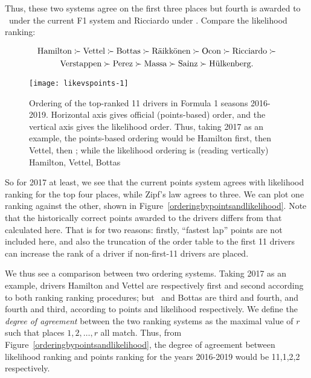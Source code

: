 \documentclass[a4,12pt]{article}
\begin{document}
\noindent Thus, these two systems agree on the first three places but
fourth is awarded to \raik\ under the current F1 system and Ricciardo
under \citeauthor{zipf1949}.  Compare the likelihood ranking:

\begin{multline}\nonumber
\mbox{Hamilton}\succ
\mbox{Vettel}\succ
\mbox{Bottas}\succ
\mbox{R\"{a}ikk\"{o}nen}\succ
\mbox{Ocon}\succ
\mbox{Ricciardo}\succ\\
\mbox{Verstappen}\succ
\mbox{Perez}\succ
\mbox{Massa}\succ
\mbox{Sainz}\succ
\mbox{H\"{u}lkenberg}.
\end{multline}

\begin{figure}
{\centering \texttt{[image: likevspoints-1]}}
\caption{\doublespacing Ordering of
  the \label{orderingbypointsandlikelihood} top-ranked 11 drivers in
  Formula 1 seasons 2016-2019.  Horizontal axis gives official
  (points-based) order, and the vertical axis gives the likelihood
  order.  Thus, taking 2017 as an example, the points-based ordering
  would be Hamilton first, then Vettel, then \raik; while the
  likelihood ordering is (reading vertically) Hamilton, Vettel, Bottas
}\label{fig:likevspoints}
\end{figure}

\noindent So for 2017 at least, we see that the current points system
agrees with likelihood ranking for the top four places, while Zipf's
law agrees to three.  We can plot one ranking against the other, shown
in Figure~\ref{orderingbypointsandlikelihood}.  Note that the
historically correct points awarded to the drivers differs from that
calculated here.  That is for two reasons: firstly, ``fastest lap''
points are not included here, and also the truncation of the order
table to the first 11 drivers can increase the rank of a driver if
non-first-11 drivers are placed.

We thus see a comparison between two ordering systems.  Taking 2017 as
an example, drivers Hamilton and Vettel are respectively first and
second according to both ranking ranking procedures; but \raik\ and
Bottas are third and fourth, and fourth and third, according to points
and likelihood respectively. We define the \emph{degree of agreement}
between the two ranking systems as the maximal value of \(r\) such
that places \(1,2,\ldots, r\) all match.  Thus, from
Figure~\ref{orderingbypointsandlikelihood}, the degree of agreement
between likelihood ranking and points ranking for the years 2016-2019
would be 11,1,2,2 respectively.
\end{document}
